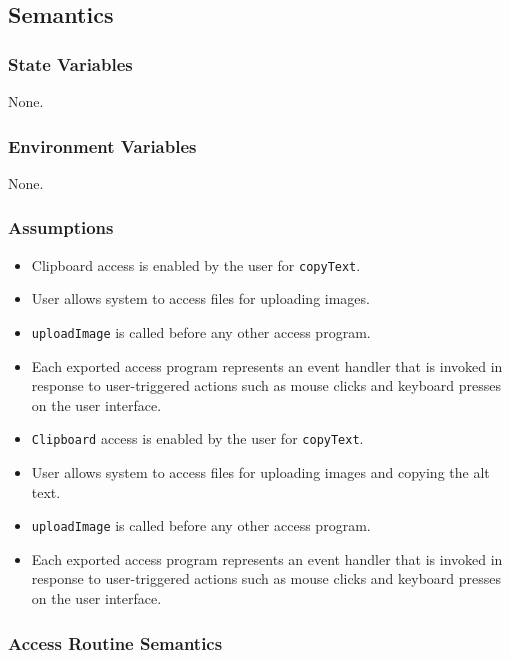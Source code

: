 \documentclass[12pt, titlepage]{article}
\begin{document}
\subsection{Semantics}

\subsubsection{State Variables}

None.

\subsubsection{Environment Variables}
None.

\subsubsection{Assumptions}
  
  \begin{itemize}
    \item Clipboard access is enabled by the user for \texttt{copyText}.
    \item User allows system to access files for uploading images.
    \item \texttt{uploadImage} is called before any other access program.
    \item Each exported access program represents an event handler that is invoked in response to user-triggered actions such as mouse clicks and keyboard presses on the user interface.
  \end{itemize}

\begin{itemize}
  \item \texttt{Clipboard} access is enabled by the user for \texttt{copyText}.
  \item User allows system to access files for uploading images and
    copying the alt text.
  \item \texttt{uploadImage} is called before any other access program.
  \item Each exported access program represents an event handler that
    is invoked in response to user-triggered actions such as mouse
    clicks and keyboard presses on the user interface.
\end{itemize}

\subsubsection{Access Routine Semantics}
\end{document}

